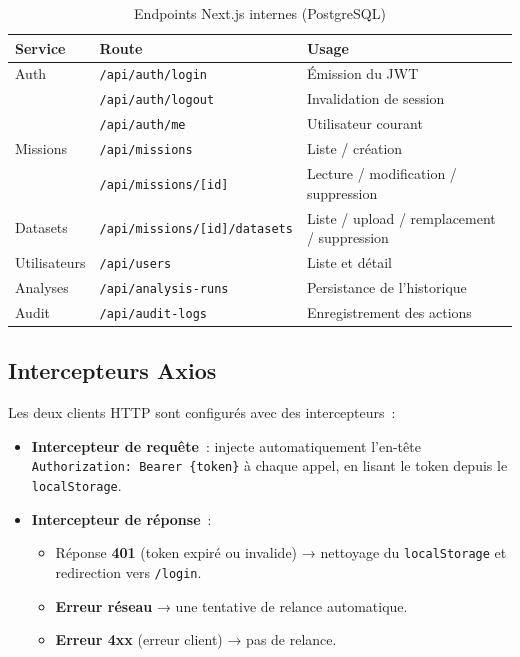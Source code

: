 \begin{table}[H]
\centering
\caption{Endpoints Next.js internes (PostgreSQL)}
\label{tab:api-app}
\begin{tabular}{p{4cm} p{3.5cm} p{6cm}}
\toprule
\textbf{Service} & \textbf{Route} & \textbf{Usage} \\
\midrule
Auth & \texttt{/api/auth/login} & Émission du JWT \\
& \texttt{/api/auth/logout} & Invalidation de session \\
& \texttt{/api/auth/me} & Utilisateur courant \\
Missions & \texttt{/api/missions} & Liste / création \\
& \texttt{/api/missions/[id]} & Lecture / modification / suppression \\
Datasets & \texttt{/api/missions/[id]/datasets} & Liste / upload / remplacement / suppression \\
Utilisateurs & \texttt{/api/users} & Liste et détail \\
Analyses & \texttt{/api/analysis-runs} & Persistance de l'historique \\
Audit & \texttt{/api/audit-logs} & Enregistrement des actions \\
\bottomrule
\end{tabular}
\end{table}

\subsection{Intercepteurs Axios}

Les deux clients HTTP sont configurés avec des intercepteurs~:

\begin{itemize}[leftmargin=1.5em]
  \item \textbf{Intercepteur de requête}~: injecte automatiquement l'en-tête \texttt{Authorization: Bearer \{token\}} à chaque appel, en lisant le token depuis le \texttt{localStorage}.
  \item \textbf{Intercepteur de réponse}~:
    \begin{itemize}[leftmargin=1em]
      \item Réponse \textbf{401} (token expiré ou invalide) → nettoyage du \texttt{localStorage} et redirection vers \texttt{/login}.
      \item \textbf{Erreur réseau} → une tentative de relance automatique.
      \item \textbf{Erreur 4xx} (erreur client) → pas de relance.
    \end{itemize}
\end{itemize}

